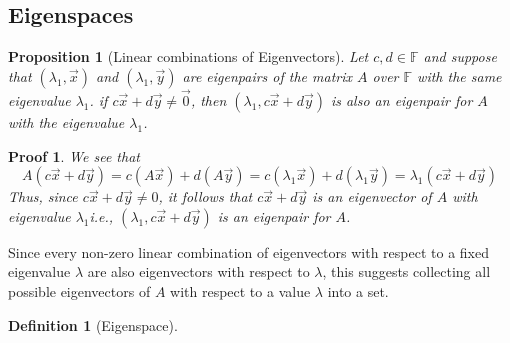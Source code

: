 \documentclass[10pt]{article}
\theoremstyle{break}
\newtheorem*{pf}{Proof}
\newtheorem{defn}{Definition}[subsection]
\newtheorem{prop}[thm]{Proposition}
\begin{document}
\subsection{Eigenspaces}
\begin{prop}[Linear combinations of Eigenvectors]
  Let $c, d \in \mathbb{F}$ and suppose that $(\lambda_1, \vec{x})$ and $(\lambda_1, \vec{y})$ are eigenpairs of the matrix $A$ over $\mathbb{F}$ with the same eigenvalue $\lambda_1$. if $c\vec{x} + d\vec{y} \ne \vec{0}$, then $(\lambda_1, c\vec{x} + d\vec{y})$ is also an eigenpair for $A$ with the eigenvalue $\lambda_1$.
\end{prop}
\begin{pf}
  We see that $$A(c\vec{x} + d\vec{y}) = c(A\vec{x}) + d(A \vec{y}) = c(\lambda_1\vec{x}) + d(\lambda_1\vec{y}) = \lambda_1(c\vec{x} + d\vec{y})$$ Thus, since $c\vec{x} + d\vec{y} \ne 0$, it follows that $c\vec{x} + d\vec{y}$ is an eigenvector of $A$ with eigenvalue $\lambda_1$i.e., $(\lambda_1, c\vec{x} + d\vec{y})$ is an eigenpair for $A$.
\end{pf}
Since every non-zero linear combination of eigenvectors with respect to a fixed eigenvalue $\lambda$ are also eigenvectors with respect to $\lambda$, this suggests collecting all possible eigenvectors of $A $ with respect to a value $\lambda $ into a set.
\begin{defn}[Eigenspace]
  
\end{defn}
\end{document}
